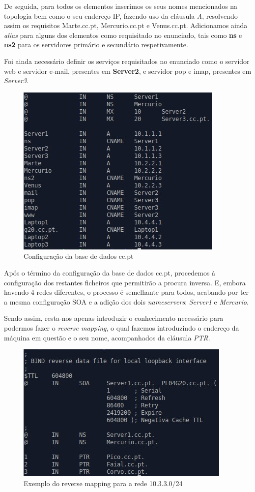 \documentclass[11pt]{article}
\begin{document}
\par De seguida, para todos os elementos inserimos os seus nomes mencionados na topologia bem como o seu endereço IP, fazendo uso da cláusula \textit{A}, resolvendo assim os requisitos Marte.cc.pt, Mercurio.cc.pt e Venus.cc.pt. Adicionamos ainda \textit{alias} para alguns dos elementos como requisitado no enunciado, tais como \textbf{ns} e \textbf{ns2} para os servidores primário e secundário respetivamente.

\par Foi ainda necessário definir os serviços requisitados no enunciado como o servidor web e servidor e-mail, presentes em \textbf{Server2}, e servidor pop e imap, presentes em \textit{Server3}.

\begin{figure}[H]
    \centering
    \includegraphics[width=.6\textwidth]{images/Parte2/2_restoCCPT.jpg}
    \caption{Configuração da base de dados cc.pt}
    \label{fig:configCCPT}
\end{figure}

\par Após o término da configuração da base de dados cc.pt, procedemos à configuração dos restantes ficheiros que permitirão a procura inversa. E, embora havendo 4 redes diferentes, o processo é semelhante para todos, acabando por ter a mesma configuração SOA e a adição dos dois \textit{nameservers}: \textit{Server1} e \textit{Mercurio}.

\par Sendo assim, resta-nos apenas introduzir o conhecimento necessário para podermos fazer o \textit{reverse mapping}, o qual fazemos introduzindo o endereço da máquina em questão e o seu nome, acompanhados da cláusula \textit{PTR}.

\begin{figure}[H]
    \centering
    \includegraphics[width=.6\textwidth]{images/Parte2/2_reverseExemplo.jpg}
    \caption{Exemplo do reverse mapping para a rede 10.3.3.0/24}
    \label{fig:rev10330}
\end{figure}
\end{document}
